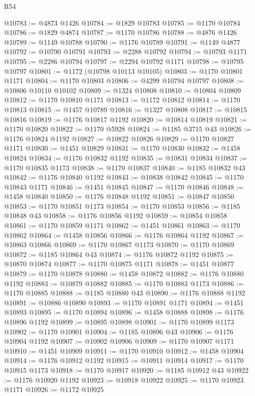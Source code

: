\begin{lexlean}{R54}
\begin{coremodule}
@10783 := @4873 @1426
@10784 := @1829 @10783
@10785 := @1170 @10784
@10786 := @1829 @4874
@10787 := @1170 @10786
@10788 := @4876 @1426
@10789 := @1149 @10788
@10790 := @1176 @10789
@10791 := @1149 @4877
@10792 := @10790 @10791
@10793 := @2288 @10792
@10794 := @10793 @1171
@10795 := @2286 @10794
@10797 := @2294 @10792 @1171
@10798 := @10795 @10797
@10801 := @1172 (@10798 @10113 @10105)
@10803 := @1170 @10801 @1171
@10804 := @1170 @10803
@10806 := @4299 @10794 @10797
@10808 := @10806 @10110 @10102
@10809 := @1324 @10808
@10810 := @10804 @10809
@10812 := @1170 @10810 @1171
@10813 := @1172 @10812
@10814 := @1170 @10813
@10815 := @1457 @10789
@10816 := @1327 @10808
@10817 := @10815 @10816
@10819 := @1176 @10817 @1192
@10820 := @10814 @10819
@10821 := @1170 @10820
@10822 := @1170 @5928
@10824 := @1185 @3715 @43
@10826 := @1176 @10824 @1192
@10827 := @10822 @10826
@10829 := @1170 @10827 @1171
@10830 := @1451 @10829
@10831 := @1170 @10830
@10832 := @1458 @10824
@10834 := @1176 @10832 @1192
@10835 := @10831 @10834
@10837 := @1170 @10835 @1173
@10838 := @1170 @10837
@10840 := @1185 @10832 @43
@10842 := @1176 @10840 @1192
@10843 := @10838 @10842
@10845 := @1170 @10843 @1171
@10846 := @1451 @10845
@10847 := @1170 @10846
@10848 := @1458 @10840
@10850 := @1176 @10848 @1192
@10851 := @10847 @10850
@10853 := @1170 @10851 @1173
@10854 := @1170 @10853
@10856 := @1185 @10848 @43
@10858 := @1176 @10856 @1192
@10859 := @10854 @10858
@10861 := @1170 @10859 @1171
@10862 := @1451 @10861
@10863 := @1170 @10862
@10864 := @1458 @10856
@10866 := @1176 @10864 @1192
@10867 := @10863 @10866
@10869 := @1170 @10867 @1173
@10870 := @1170 @10869
@10872 := @1185 @10864 @43
@10874 := @1176 @10872 @1192
@10875 := @10870 @10874
@10877 := @1170 @10875 @1171
@10878 := @1451 @10877
@10879 := @1170 @10878
@10880 := @1458 @10872
@10882 := @1176 @10880 @1192
@10883 := @10879 @10882
@10885 := @1170 @10883 @1173
@10886 := @1170 @10885
@10888 := @1185 @10880 @43
@10890 := @1176 @10888 @1192
@10891 := @10886 @10890
@10893 := @1170 @10891 @1171
@10894 := @1451 @10893
@10895 := @1170 @10894
@10896 := @1458 @10888
@10898 := @1176 @10896 @1192
@10899 := @10895 @10898
@10901 := @1170 @10899 @1173
@10902 := @1170 @10901
@10904 := @1185 @10896 @43
@10906 := @1176 @10904 @1192
@10907 := @10902 @10906
@10909 := @1170 @10907 @1171
@10910 := @1451 @10909
@10911 := @1170 @10910
@10912 := @1458 @10904
@10914 := @1176 @10912 @1192
@10915 := @10911 @10914
@10917 := @1170 @10915 @1173
@10918 := @1170 @10917
@10920 := @1185 @10912 @43
@10922 := @1176 @10920 @1192
@10923 := @10918 @10922
@10925 := @1170 @10923 @1171
@10926 := @1172 @10925

\end{coremodule}
\end{lexlean}
